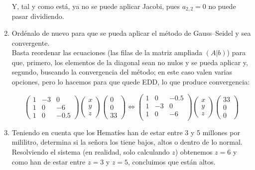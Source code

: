 \documentclass[12pt]{article}
\begin{document}
\begin{ejercicio}
\begin{enumerate}[label=\alph*)]
				Y, tal y como está, ya no se puede aplicar Jacobi, pues $a_{2,2} = 0$ no puede pasar dividiendo.
				
			\item Ordénalo de nuevo para que se pueda aplicar el método de Gauss–Seidel y sea convergente. \\
			
				Basta reordenar las ecuaciones (las filas de la matriz ampliada $(A|b)$) para que, primero, los elementos
				de la diagonal sean no nulos y se pueda aplicar y, segundo, buscando la convergencia del método; en este
				caso valen varias opciones, pero lo hacemos para que quede EDD, lo que produce convergencia:
				
					$$\begin{pmatrix}
						1 & -3 & 0 \\
						1 & 0 & -6 \\
						1 & 0 & -0.5
					\end{pmatrix} 
					\begin{pmatrix}
						x \\
						y \\
						z
					\end{pmatrix}
					\begin{pmatrix}
						0 \\
						0 \\
						33
					\end{pmatrix} \iff
					\begin{pmatrix}
					1 & 0 & -0.5 \\
					1 & -3 & 0 \\
					1 & 0 & -6 \\
					\end{pmatrix} 
					\begin{pmatrix}
					x \\
					y \\
					z
					\end{pmatrix}
					\begin{pmatrix}
					33 \\
					0 \\
					0
					\end{pmatrix}$$
			
			\item Teniendo en cuenta que los Hematíes han de estar entre 3 y 5 millones por mililitro, determina si la
			señora los tiene bajos, altos o dentro de lo normal. \\
			
				Resolviendo el sistema (en realidad, solo calculando $z$) obtenemos $z = 6$ y como han de estar entre $z = 3$ y $z = 5$, concluimos que están altos.
				
		\end{enumerate}
	\end{ejercicio}
\end{document}

